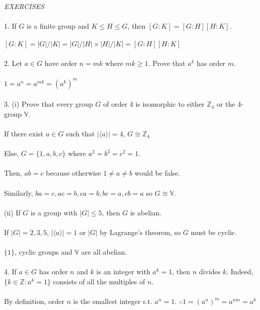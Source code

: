 \documentclass{article}
\begin{document}
\begin{siderules}\color{blue}\textit{EXERCISES}\color{black}\\\\
\color{blue}1. If \(G\) is a finite group and \(K\le H\le G\), then \([G:K]=[G:H][H:K]\).\color{black}\\\\
\null\qquad \([G:K]=|G|/|K|=|G|/|H|\times|H|/|K|=[G:H][H:K]\)\\\\
\color{blue}2. Let \(a\in G\) have order \(n=mk\) where \(mk\ge 1\). Prove that \(a^{k}\) has order \(m\).\\\\\color{black}
\null\qquad \(1=a^{n}=a^{mk}=(a^{k})^{m}\)\\\\
\color{blue}3. (i) Prove that every group \(G\) of order 4 is isomorphic to either \(\mathbb{Z}_{4}\) or the 4-group \(\mathbb{V}\).\\\\\color{black}
\null\qquad If there exist \(a\in G\) such that \(|\langle a\rangle|=4\), \(G\cong \mathbb{Z}_{4}\)\\\\
\null\qquad Else, \(G=\{1,a,b,c\}\) where \(a^{2}=b^{2}=c^{2}=1\).\\\\
\null\qquad Then, \(ab=c\) because otherwise \(1\neq a\neq b\) would be false.\\\\
\null\qquad Similarly, \(ba=c, ac=b, ca=b, bc=a, cb=a\) so \(G\cong\mathbb{V}\).\\\\
\color{blue}(ii) If \(G\) is a group with \(|G|\le 5\), then \(G\) is abelian.\\\\\color{black}
\null\qquad If \(|G|=2,3,5\), \(|\langle a\rangle|=1\) or \(|G|\) by Lagrange's theorem, so \(G\) must be cyclic.\\\\
\null\qquad \(\{1\}\), cyclic groups and \(\mathbb{V}\) are all abelian.\\\\
\color{blue}4. If \(a\in G\) has order \(n\) and \(k\) is an integer with \(a^{k}=1\), then \(n\) divides \(k\). 
Indeed, \(\{k\in\mathbb{Z}: a^{k}=1\}\) consists of all the multiples of \(n\).\\\\\color{black}
\null\qquad By definition, order \(n\) is the smallest integer s.t. \(a^{n}=1\). \(\therefore 1=(a^{n})^{m}=a^{nm}=a^{k}\)\\\\

\end{siderules}
\end{document}
